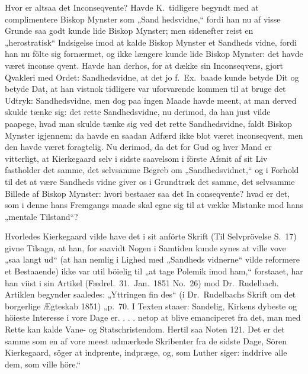 \documentclass[12pt,a4paper]{article}
\newcommand{\opage}[1]{\marginnote{\footnotesize\textit{[#1]}}}
\begin{document}
Hvor er altsaa det Inconseqvente? Havde K.\ tidligere
begyndt med at complimentere Biskop Mynster som „Sand\-%
hedsvidne,“ fordi han nu af visse Grunde saa godt kunde
lide Biskop Mynster; men sidenefter reist en „herostratisk“
Indsigelse imod at kalde Biskop Mynster et Sandheds\-%
vidne, fordi han nu fölte sig fornærmet, og ikke længere
kunde lide Biskop Mynster: det havde været inconse\-%
qvent. Havde han derhos, for at dække sin Inconseqvens,
gjort Qvakleri med Ordet: Sandhedsvidne, at det jo f.\ Ex.\ baade
kunde betyde Dit og betyde Dat, at han vistnok
tidligere var uforvarende kommen til at bruge det Udtryk:
Sandhedsvidne, men dog paa ingen Maade havde meent,
at man derved skulde tænke sig: det rette Sandhedsvidne,
nu derimod, da han just vilde paapege, hvad man skulde
tænke sig ved det rette Sandhedsvidne, faldt Biskop
Mynster igjennem: da havde en saadan Adfærd ikke
blot været inconseqvent, men den havde været foragtelig.
Nu derimod, da det for Gud og hver Mand er vitterligt,
at Kierkegaard selv i sidste saavelsom i förste Afsnit af
sit Liv fastholder det samme, det selvsamme Begreb om
\opage{21} „Sandhedsvidnet,“ og i Forhold til det at være Sandheds\-%
vidne giver os i Grundtræk det samme, det selvsamme
Billede af Biskop Mynster: hvori bestaaer saa det In\-%
conseqvente? hvad er det, som i denne hans Fremgangs\-%
maade skal egne sig til at vække Mistanke mod hans
„mentale Tilstand“?

Hvorledes Kierkegaard vilde have det i sit anförte
Skrift (Til Selvprövelse S.\ 17) givne Tilsagn, at han, for\-%
saavidt Nogen i Samtiden kunde synes at ville vove „saa
langt ud“ (at han nemlig i Lighed med „Sandheds\-%
vidnerne“ vilde reformere et Bestaaende) ikke var util\-%
böielig til „at tage Polemik imod ham,“ forstaaet, har han
viist i sin Artikel (Fædrel.\ 31.\ Jan.\ 1851 No.\ 26) mod
Dr.\ Rudelbach. Artiklen begynder saaledes: „Yttringen fin\-%
des“ (i Dr.\ Rudelbachs Skrift om det borgerlige Ægteskab
1851) „p.\ 70. I Texten staaer: Sandelig, Kirkens dybeste
og höieste Interesse i vore Dage er. . . . netop at blive
emanciperet fra det, man med Rette kan kalde Vane- og
Statschristendom. Hertil saa Noten 121. Det er det
samme som en af vore meest udmærkede Skribenter fra
de sidste Dage, Sören Kierkegaard, söger at indprente,
indpræge, og, som Luther siger: inddrive alle dem, som
ville höre.“
\end{document}
